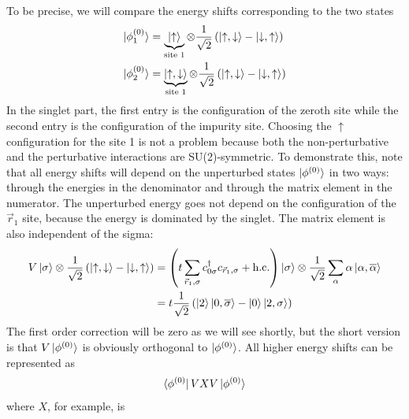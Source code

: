 \documentclass[twoside]{report}
\numberwithin{equation}{section}
\begin{document}
\\\\To be precise, we will compare the energy shifts corresponding to the two states
\begin{equation}\begin{aligned}
	\ket{\phi^{(0)}_1} &= \underbrace{\ket{\uparrow}}_\text{site 1}\otimes\frac{1}{\sqrt 2}\left(\ket{\uparrow, \downarrow} - \ket{\downarrow, \uparrow} \right) \\
	\ket{\phi^{(0)}_2} &= \underbrace{\ket{\uparrow, \downarrow}}_\text{site 1}\otimes\frac{1}{\sqrt 2}\left(\ket{\uparrow, \downarrow} - \ket{\downarrow, \uparrow} \right) 
\end{aligned}\end{equation}
In the singlet part, the first entry is the configuration of the zeroth site while the second entry is the configuration of the impurity site. Choosing the \(\uparrow\) configuration for the site 1 is not a problem because both the non-perturbative and the perturbative interactions are SU(2)-symmetric. To demonstrate this, note that all energy shifts will depend on the unperturbed states \(\ket{\phi^{(0)}}\) in two ways: through the energies in the denominator and through the matrix element in the numerator. The unperturbed energy goes not depend on the configuration of the \(\vec r_1\) site, because the energy is dominated by the singlet. The matrix element is also independent of the sigma:
\begin{equation}\begin{aligned}
	V\ket{\sigma}\otimes\frac{1}{\sqrt 2}\left(\ket{\uparrow, \downarrow} - \ket{\downarrow, \uparrow} \right) &= \left(t\sum_{\vec r_1,\sigma} c^\dagger_{0\sigma}c_{\vec r_1,\sigma} +\text{h.c.}\right) \ket{\sigma}\otimes\frac{1}{\sqrt 2}\sum_\alpha\alpha\ket{\alpha, \overline\alpha}\\
														   &=t\frac{1}{\sqrt 2}\left(\ket{2}\ket{0,\overline\sigma} - \ket{0}\ket{2,\sigma}\right)
\end{aligned}\end{equation}
The first order correction will be zero as we will see shortly, but the short version is that \(V\ket{\phi^{(0)}}\) is obviously orthogonal to \(\ket{\phi^{(0)}}\). All higher energy shifts can be represented as
\begin{equation}\begin{aligned}
	\bra{\phi^{(0)}} V X V \ket{\phi^{(0)}}
\end{aligned}\end{equation}
where \(X\), for example, is 
\end{document}
